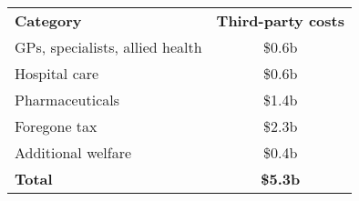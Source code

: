 \bgroup
\def\arraystretch{1.2}
\begin{tabular}{lc}
\toprule
\textbf{Category} & \multicolumn{1}{p{2.8cm}}{\centering\textbf{Third-party costs}} \\ \cmidrule(lr){1-2}
GPs, specialists, allied health & \$0.6b \\
Hospital care & \$0.6b\\
Pharmaceuticals & \$1.4b \\
Foregone tax & \$2.3b\\
Additional welfare & \$0.4b\\ \cmidrule(lr){1-2}
\textbf{Total} & \textbf{\$5.3b} \\
\bottomrule
\end{tabular}
\egroup